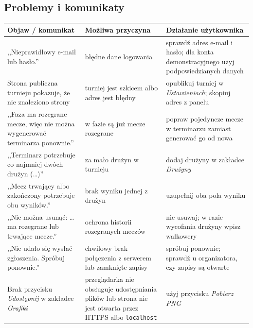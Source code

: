 \documentclass[11pt,a4paper,oneside]{article}
\newif\ifpodpowiedzi
\newcommand{\podpowiedz}[1]{\ifpodpowiedzi\par\begingroup\small\color{hintcolor}\textit{Wskazówka: #1}\par\endgroup\fi}
\begin{document}
\subsection{Problemy i komunikaty}
\podpowiedz{Opisz typowe problemy z perspektywy użytkownika: jak je rozpoznać, co oznaczają i jakie działania podjąć. Podaj rzeczywiste komunikaty, jeśli występują. Dodaj wiersze według potrzeb.}
\begin{tabularx}{\textwidth}{@{}Y Y Y@{}}
\toprule
Objaw / komunikat & Możliwa przyczyna & Działanie użytkownika\\
\midrule
,,Nieprawidłowy e-mail lub hasło.'' & błędne dane logowania & sprawdź adres e-mail i hasło; dla konta demonstracyjnego użyj podpowiedzianych danych\\
Strona publiczna turnieju pokazuje, że nie znaleziono strony & turniej jest szkicem albo adres jest błędny & opublikuj turniej w \emph{Ustawieniach}; skopiuj adres z panelu\\
,,Faza ma rozegrane mecze, więc nie można wygenerować terminarza ponownie.'' & w fazie są już mecze rozegrane & popraw pojedyncze mecze w terminarzu zamiast generować go od nowa\\
,,Terminarz potrzebuje co najmniej dwóch drużyn (\dots)'' & za mało drużyn w turnieju & dodaj drużyny w zakładce \emph{Drużyny}\\
,,Mecz trwający albo zakończony potrzebuje obu wyników.'' & brak wyniku jednej z drużyn & uzupełnij oba pola wyniku\\
,,Nie można usunąć: \dots{} ma rozegrane lub trwające mecze.'' & ochrona historii rozegranych meczów & nie usuwaj; w razie wycofania drużyny wpisz walkowery\\
,,Nie udało się wysłać zgłoszenia. Spróbuj ponownie.'' & chwilowy brak połączenia z serwerem lub zamknięte zapisy & spróbuj ponownie; sprawdź u organizatora, czy zapisy są otwarte\\
Brak przycisku \emph{Udostępnij} w zakładce \emph{Grafiki} & przeglądarka nie obsługuje udostępniania plików lub strona nie jest otwarta przez HTTPS albo \texttt{localhost} & użyj przycisku \emph{Pobierz PNG}\\
\bottomrule
\end{tabularx}
\end{document}
